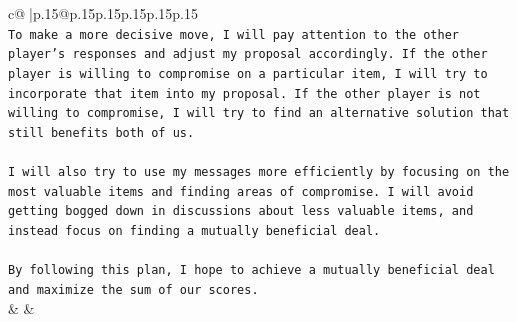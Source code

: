 \documentclass{article}
\begin{document}
{\begin{supertabular}{c@{$\;$}|p{.15\linewidth}@{}p{.15\linewidth}p{.15\linewidth}p{.15\linewidth}p{.15\linewidth}p{.15\linewidth}}
{{{\\ 
\texttt{To make a more decisive move, I will pay attention to the other player's responses and adjust my proposal accordingly. If the other player is willing to compromise on a particular item, I will try to incorporate that item into my proposal. If the other player is not willing to compromise, I will try to find an alternative solution that still benefits both of us.} \\
\\ 
\texttt{I will also try to use my messages more efficiently by focusing on the most valuable items and finding areas of compromise. I will avoid getting bogged down in discussions about less valuable items, and instead focus on finding a mutually beneficial deal.} \\
\\ 
\texttt{By following this plan, I hope to achieve a mutually beneficial deal and maximize the sum of our scores.} \\
            }
        }
    }
    & & \\ \\


\end{supertabular}}
\end{document}
